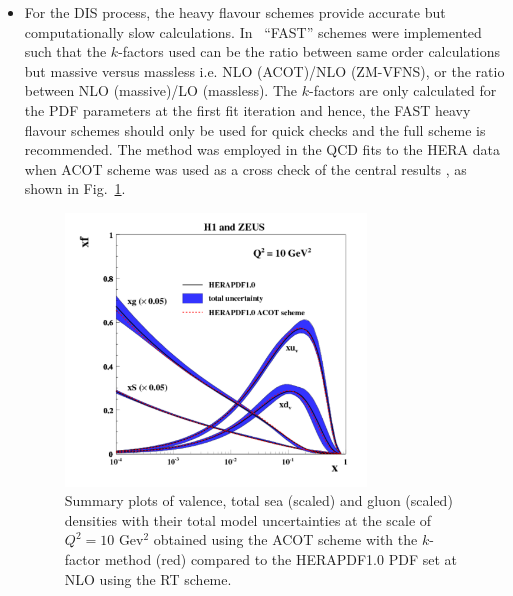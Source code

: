 \begin{description}
\begin{itemize}
\item For the DIS process, the heavy flavour schemes provide accurate but computationally slow calculations. 
In \fitter~``FAST'' schemes were implemented 
such that the $k$-factors used can be
the ratio between same order calculations but massive versus massless
i.e. NLO (ACOT)/NLO (ZM-VFNS), or 
the ratio between NLO (massive)/LO (massless).
The $k$-factors are only calculated for the PDF parameters at the first 
fit iteration
 and hence, the FAST heavy flavour schemes should only be used 
for quick checks and the full scheme is recommended.
The method was employed in the QCD fits to the HERA data when ACOT scheme was used as a cross check of the central results \cite{h1zeus:2009wt}, as shown in Fig.~\ref{fig:acotrt}.
\begin{figure}[!ht]
   \centering
   \includegraphics[width=8cm]{heraacot.pdf}
   \caption{Summary plots of valence, total sea (scaled) and gluon (scaled) densities with their total model uncertainties at the scale of $Q^2=10$ Gev$^2$ obtained using the ACOT scheme with the $k$-factor method (red) compared to the HERAPDF1.0 PDF set at NLO using the RT scheme.}
 \label{fig:acotrt}
\end{figure}




\end{itemize}
\end{description}
